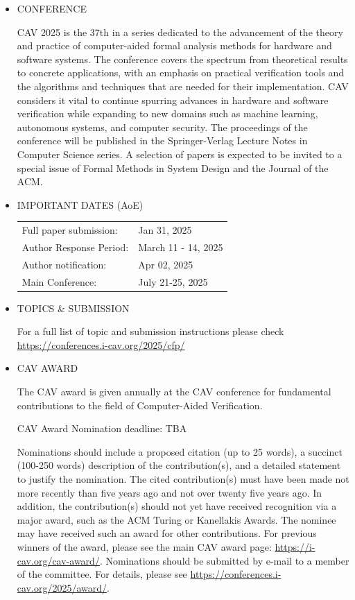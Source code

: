 \documentclass[prodmode,acmtecs]{acmsmall} %
\begin{document}
\begin{itemize}\item  CONFERENCE 
 
  CAV 2025 is the 37th in a series dedicated to the advancement of the theory and practice of computer-aided formal analysis methods for hardware and software systems. The conference covers the spectrum from theoretical results to concrete applications, with an emphasis on practical verification tools and the algorithms and techniques that are needed for their implementation. CAV considers it vital to continue spurring advances in hardware and software verification while expanding to new domains such as machine learning, autonomous systems, and computer security. The proceedings of the conference will be published in the Springer-Verlag Lecture Notes in Computer Science series. A selection of papers is expected to be invited to a special issue of Formal Methods in System Design and the Journal of the ACM. 
 
\item  IMPORTANT DATES (AoE) 
 
\begin{tabulary}{\linewidth}{LL}Full paper submission:  & Jan 31, 2025 \\
Author Response Period:  & March 11 - 14, 2025 \\
Author notification:  & Apr 02, 2025 \\
Main Conference:  & July 21-25, 2025 \\
\end{tabulary}
 
\item  TOPICS \& SUBMISSION 
 
  For a full list of topic and submission instructions please check \href{https://conferences.i-cav.org/2025/cfp/}{https://conferences.i-cav.org/2025/cfp/} 
 
\item  CAV AWARD 
 
  The CAV award is given annually at the CAV conference for fundamental contributions to the field of Computer-Aided Verification.  
 
CAV Award Nomination deadline: TBA 
 
  Nominations should include a proposed citation (up to 25 words), a succinct (100-250 words) description of the contribution(s), and a detailed statement to justify the nomination. The cited contribution(s) must have been made not more recently than five years ago and not over twenty five years ago. In addition, the contribution(s) should not yet have received recognition via a major award, such as the ACM Turing or Kanellakis Awards. The nominee may have received such an award for other contributions. For previous winners of the award, please see the main CAV award page: \href{https://i-cav.org/cav-award/}{https://i-cav.org/cav-award/}.  Nominations should be submitted by e-mail to a member of the committee. For details, please see \href{https://conferences.i-cav.org/2025/award/}{https://conferences.i-cav.org/2025/award/}. 
 

\end{itemize}
\end{document}
